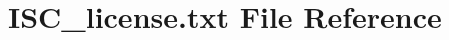 \hypertarget{_i_s_c__license_8txt}{
\section{\-I\-S\-C\-\_\-license.txt \-File \-Reference}
\label{_i_s_c__license_8txt}
}
